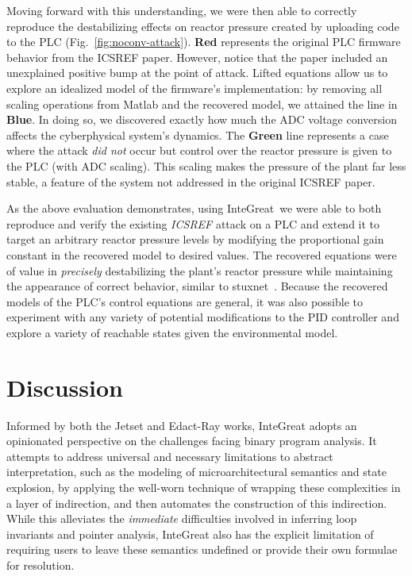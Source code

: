 Moving forward with this understanding, we were then able to correctly reproduce the destabilizing effects on reactor pressure created by uploading code to the PLC (Fig.~\ref{fig:noconv-attack}).
\textbf{Red} represents the original PLC firmware behavior from the ICSREF paper.
However, notice that the paper included an unexplained positive bump at the point of attack.
Lifted equations allow us to explore an idealized model of the firmware's implementation: by removing all scaling operations from Matlab and the recovered model, we attained the line in \textbf{Blue}.
In doing so, we discovered exactly how much the ADC voltage conversion affects the cyberphysical system's dynamics.
The \textbf{Green} line represents a case where the attack \emph{did not} occur but control over the reactor pressure is given to the PLC (with ADC scaling).
This scaling makes the pressure of the plant far less stable, a feature of the system not addressed in the original ICSREF paper.

As the above evaluation demonstrates, using InteGreat\ we were able to both reproduce and verify the existing \emph{ICSREF} attack on a PLC and extend it to target an arbitrary reactor pressure levels by modifying the proportional gain constant in the recovered model to desired values.
The recovered equations were of value in \emph{precisely} destabilizing the plant's reactor pressure while maintaining the appearance of correct behavior, similar to stuxnet~\cite{baezner2017stuxnet}.
Because the recovered models of the PLC's control equations are general, it was also possible to experiment with any variety of potential modifications to the PID controller and explore a variety of reachable states given the environmental model.

\section{Discussion}

Informed by both the Jetset and Edact-Ray works, InteGreat adopts an opinionated perspective on the challenges facing binary program analysis.
It attempts to address universal and necessary limitations to abstract interpretation, such as the modeling of microarchitectural semantics and state explosion, by applying the well-worn technique of wrapping these complexities in a layer of indirection, and then automates the construction of this indirection.
While this alleviates the \emph{immediate} difficulties involved in inferring loop invariants and pointer analysis, InteGreat also has the explicit limitation of requiring users to leave these semantics undefined or provide their own formulae for resolution.

